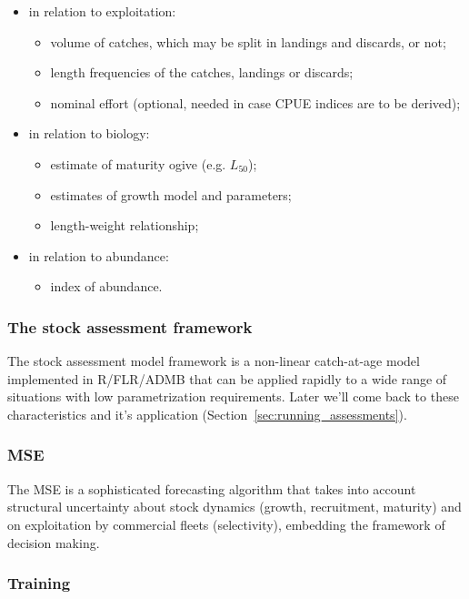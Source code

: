 \documentclass[a4paper,english,10pt]{article}\usepackage[]{graphicx}\usepackage[]{color}
\begin{document}
\begin{itemize}
	\item in relation to exploitation:
	\begin{itemize}
		\item volume of catches, which may be split in landings and discards, or not;
		\item length frequencies of the catches, landings or discards;
		\item nominal effort (optional, needed in case CPUE indices are to be derived);
	\end{itemize}
	\item in relation to biology:
	\begin{itemize}
		\item estimate of maturity ogive (e.g. $L_{50}$);
		\item estimates of growth model and parameters;
		\item length-weight relationship;
	\end{itemize}
	\item in relation to abundance:
	\begin{itemize}
		\item index of abundance.
	\end{itemize}	
\end{itemize}

\subsubsection{The stock assessment framework}

The stock assessment model framework is a non-linear catch-at-age model implemented in R/FLR/ADMB that can be applied rapidly to a wide range of situations with low parametrization requirements. Later we'll come back to these characteristics and it's application (Section~\ref{sec:running_assessments}).

\subsubsection{MSE}

The MSE is a sophisticated forecasting algorithm that takes into account structural uncertainty about stock dynamics (growth, recruitment, maturity) and on exploitation by commercial fleets (selectivity), embedding the framework of decision making. 

\subsubsection{Training}
\end{document}
